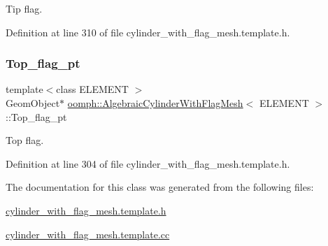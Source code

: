 Tip flag. 



Definition at line 310 of file cylinder\+\_\+with\+\_\+flag\+\_\+mesh.\+template.\+h.

\mbox{\label{classoomph_1_1AlgebraicCylinderWithFlagMesh_a326e4789fe96b3052a8beb51ec9e94d0}} 
\subsubsection{\texorpdfstring{Top\+\_\+flag\+\_\+pt}{Top\_flag\_pt}}
{\footnotesize\ttfamily template$<$class E\+L\+E\+M\+E\+NT $>$ \\
Geom\+Object$\ast$ \hyperlink{classoomph_1_1AlgebraicCylinderWithFlagMesh}{oomph\+::\+Algebraic\+Cylinder\+With\+Flag\+Mesh}$<$ E\+L\+E\+M\+E\+NT $>$\+::Top\+\_\+flag\+\_\+pt\hspace{0.3cm}{\ttfamily [protected]}}



Top flag. 



Definition at line 304 of file cylinder\+\_\+with\+\_\+flag\+\_\+mesh.\+template.\+h.



The documentation for this class was generated from the following files\+:\begin{DoxyCompactItemize}
\item 
\hyperlink{cylinder__with__flag__mesh_8template_8h}{cylinder\+\_\+with\+\_\+flag\+\_\+mesh.\+template.\+h}\item 
\hyperlink{cylinder__with__flag__mesh_8template_8cc}{cylinder\+\_\+with\+\_\+flag\+\_\+mesh.\+template.\+cc}\end{DoxyCompactItemize}
